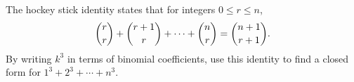 The hockey stick identity states that for integers $0\le r\le n$,
\[\dbinom rr+\dbinom{r+1}r+\cdots+\dbinom nr=\dbinom{n+1}{r+1}.\]
By writing $k^3$ in terms of binomial coefficients, use this identity to find a closed form for $1^3+2^3+\cdots+n^3$.
